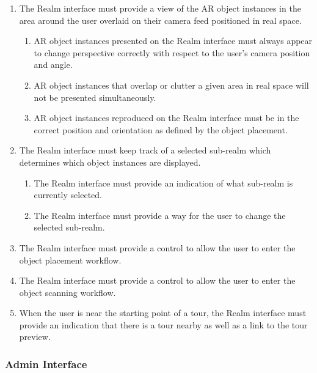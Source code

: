 \documentclass{article}
\begin{document}
\begin{enumerate}[align=left, label=\textbf{RI-FR\arabic*:}]
    \item The Realm interface must provide a view of the AR object instances in the area around the user overlaid on their camera feed positioned in real space.
          \begin{enumerate}[align=left, label=\textbf{RI-FR1.\arabic*:}]
              \item AR object instances presented on the Realm interface must always appear to change perspective correctly with respect to the user’s camera position and angle.
              \item AR object instances that overlap or clutter a given area in real space will not be presented simultaneously.
              \item AR object instances reproduced on the Realm interface must be in the correct position and orientation as defined by the object placement.
          \end{enumerate}

    \item The Realm interface must keep track of a selected sub-realm which determines which object instances are displayed.
          \begin{enumerate}[align=left, label=\textbf{RI-FR2.\arabic*:}]
              \item The Realm interface must provide an indication of what sub-realm is currently selected.
              \item The Realm interface must provide a way for the user to change the selected sub-realm.
          \end{enumerate}

    \item The Realm interface must provide a control to allow the user to enter the object placement workflow.
    \item The Realm interface must provide a control to allow the user to enter the object scanning workflow.
    \item When the user is near the starting point of a tour, the Realm interface must provide an indication that there is a tour nearby as well as a link to the tour preview.
\end{enumerate}


\subsubsection{Admin Interface}
\label{ssub:admin_interface}
\end{document}
